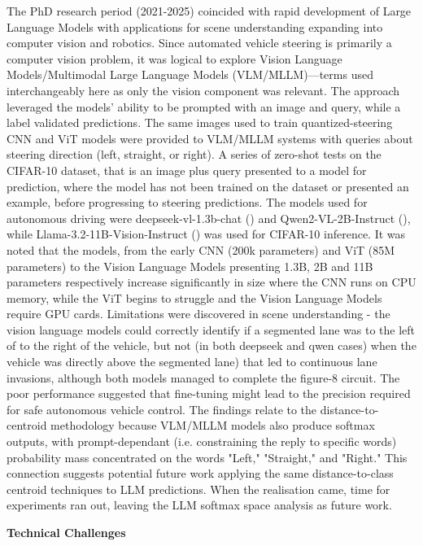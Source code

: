 The PhD research period (2021-2025) coincided with rapid development of Large Language Models with applications for scene understanding expanding into computer vision and robotics. Since automated vehicle steering is primarily a computer vision problem, it was logical to explore Vision Language Models/Multimodal Large Language Models (VLM/MLLM)—terms used interchangeably here as only the vision component was relevant.
The approach leveraged the models' ability to be prompted with an image and query, while a label validated predictions. The same images used to train quantized-steering CNN and ViT models were provided to VLM/MLLM systems with queries about steering direction (left, straight, or right). A series of zero-shot tests on the CIFAR-10 dataset, that is an image plus query presented to a model for prediction, where the model has not been trained on the dataset or presented an example, before progressing to steering predictions. The models used for autonomous driving were deepseek-vl-1.3b-chat (\cite{zeng2024deepseek}) and Qwen2-VL-2B-Instruct (\cite{bai2023qwen}), while Llama-3.2-11B-Vision-Instruct (\cite{meta2024llama3vision}) was used for CIFAR-10 inference. It was noted that the models, from the early CNN (200k parameters) and ViT (85M parameters) to the Vision Language Models presenting  1.3B, 2B and 11B parameters respectively increase significantly in size where the CNN runs on CPU memory, while the ViT begins to struggle and the Vision Language Models require GPU cards.
Limitations were discovered in scene understanding - the vision language models could correctly identify if a segmented lane was to the left of to the right of the vehicle, but not (in both deepseek and qwen cases) when the vehicle was directly above the segmented lane) that led to continuous lane invasions, although both models managed to complete the figure-8 circuit. The poor performance suggested that fine-tuning might lead to the precision required for safe autonomous vehicle control.
The findings relate to the distance-to-centroid methodology because VLM/MLLM models also produce softmax outputs, with prompt-dependant (i.e. constraining the reply to specific words) probability mass concentrated on the words "Left," "Straight," and "Right." This connection suggests potential future work applying the same distance-to-class centroid techniques to LLM predictions. When the realisation came, time for experiments ran out, leaving the LLM softmax space analysis as future work.

\textbf{Technical Challenges}

